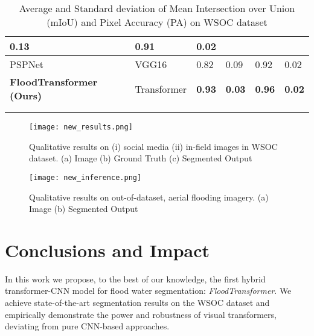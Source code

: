 \documentclass{article}
\begin{document}
\begin{table*}[]
\begin{tabular}{llllll}
  \multicolumn{1}{l|}{0.13} &
  \multicolumn{1}{l|}{0.91} &
  \multicolumn{1}{l|}{0.02} \\ \hline
\multicolumn{1}{|l|}{PSPNet \cite{pspnet}} &
  \multicolumn{1}{l|}{VGG16} &
  \multicolumn{1}{l|}{0.82} &
  \multicolumn{1}{l|}{0.09} &
  \multicolumn{1}{l|}{0.92} &
  \multicolumn{1}{l|}{0.02} \\ \hline
\multicolumn{1}{|l|}{\textbf{FloodTransformer (Ours)}} &
  \multicolumn{1}{l|}{Transformer} &
  \multicolumn{1}{l|}{\textbf{0.93}} &
  \multicolumn{1}{l|}{\textbf{0.03}} &
  \multicolumn{1}{l|}{\textbf{0.96}} &
  \multicolumn{1}{l|}{\textbf{0.02}} \\ \hline
 &
   &
   &
   &
   &
   \\
 &
   &
   &
   &
   &
   \\

  
\end{tabular}
\vspace{-20pt}
\caption{\centering Average and Standard deviation of Mean Intersection over Union
(mIoU) and Pixel Accuracy (PA) on WSOC dataset}
\label{tab:my-table-1}
\end{table*}

\begin{figure}[ht]
    \centering

    {{\texttt{[image: new\_results.png]}}}\enskip
    \caption{\centering Qualitative results on (i) social media (ii) in-field images in WSOC dataset. \newline \centering (a) Image (b) Ground Truth (c) Segmented Output}\label{fig:WSOC}\end{figure}

\begin{figure}[ht]
    \centering

    {{\texttt{[image: new\_inference.png]}}}\enskip
    \caption{\centering Qualitative results on out-of-dataset, aerial flooding imagery. \newline \centering (a) Image (b) Segmented Output}\label{fig:Unlabelled}\end{figure}

\section{Conclusions and Impact}
In this work we propose, to the best of our knowledge, the first hybrid transformer-CNN model for flood water segmentation: \textit{FloodTransformer}. We achieve state-of-the-art segmentation results on the WSOC dataset and empirically demonstrate the power and robustness of visual transformers, deviating from pure CNN-based approaches.
\end{document}
